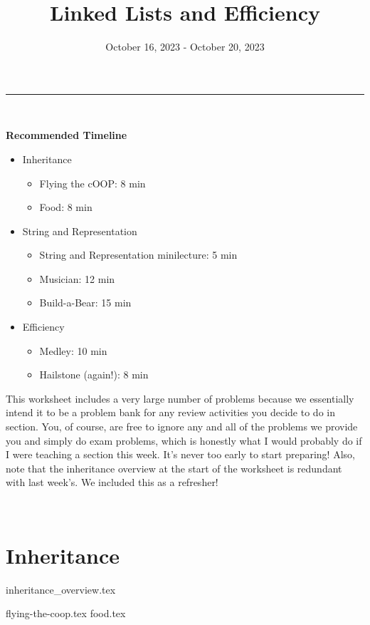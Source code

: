 \documentclass{exam}
\title{Linked Lists and Efficiency}
\date{October 16, 2023 - October 20, 2023}
\begin{document}
\maketitle
\rule{\textwidth}{0.15em}
​
\begin{meta}
    \textbf{Recommended Timeline}
    \begin{itemize}
        \item Inheritance
        \begin{itemize}
            \item Flying the cOOP: 8 min
            \item Food: 8 min
        \end{itemize}
        \item String and Representation
        \begin{itemize}
            \item String and Representation minilecture: 5 min
            \item Musician: 12 min
            \item Build-a-Bear: 15 min
        \end{itemize}
        \item Efficiency
        \begin{itemize}
            \item Medley: 10 min
            \item Hailstone (again!): 8 min
        \end{itemize}
    \end{itemize}
    This worksheet includes a very large number of problems because we essentially intend it to be a problem bank for any review activities you decide to do in section. You, of course, are free to ignore any and all of the problems we provide you and simply do exam problems, which is honestly what I would probably do if I were teaching a section this week. It's never too early to start preparing!
    \newline Also, note that the inheritance overview at the start of the worksheet is redundant with last week's. We included this as a refresher!
\end{meta}
​
\section{Inheritance}
{inheritance_overview.tex}
\begin{questions}
    {flying-the-coop.tex}
    {food.tex}
    \newpage
\end{questions}
​
\end{document}
